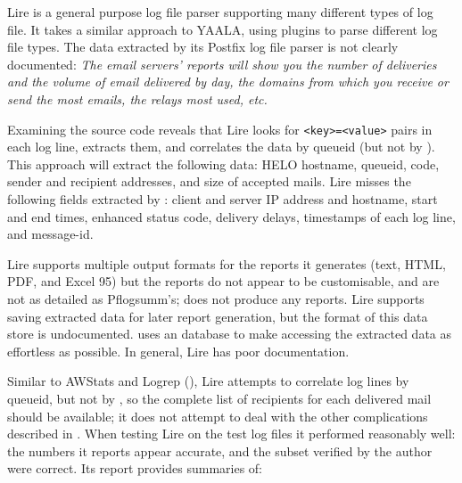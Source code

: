 Lire is a general purpose log file parser supporting many different types
of log file.  It takes a similar approach to YAALA, using plugins to parse
different log file types.  The data extracted by its Postfix log file
parser is not clearly documented: \textit{The email servers' reports will
show you the number of deliveries and the volume of email delivered by day,
the domains from which you receive or send the most emails, the relays most
used, etc\empty{}.\/}

Examining the source code reveals that Lire looks for
\texttt{<key>=<value>} pairs in each log line, extracts them, and
correlates the data by queueid (but not by ).  This approach
will extract the following data: HELO hostname, queueid, 
code, sender and recipient addresses, and size of accepted mails.  Lire
misses the following fields extracted by \parsername{}: client and server
IP address and hostname, start and end times, enhanced status code,
delivery delays, timestamps of each log line, and message-id\@.

Lire supports multiple output formats for the reports it generates (text,
HTML, PDF, and Excel 95) but the reports do not appear to be customisable,
and are not as detailed as Pflogsumm's; \parsername{} does not produce any
reports.  Lire supports saving extracted data for later report generation,
but the format of this data store is undocumented.  \parsername{} uses an
 database to make accessing the extracted data as effortless
as possible.  In general, Lire has poor documentation.

Similar to AWStats and Logrep (), Lire attempts
to correlate log lines by queueid, but not by , so the
complete list of recipients for each delivered mail should be available; it
does not attempt to deal with the other complications described in
.  When testing Lire on the \numberOFlogFILES{}
test log files it performed reasonably well: the numbers it reports appear
accurate, and the subset verified by the author were correct.  Its report
provides summaries of:

